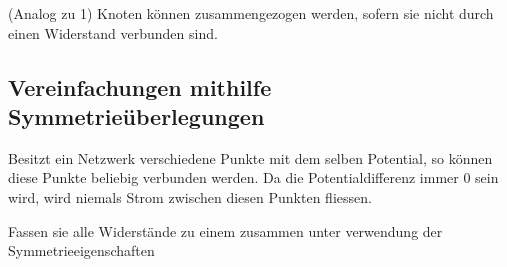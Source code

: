 										\iend
					\fix \fix
										\beginip
											(Analog zu 1) Knoten können zusammengezogen werden, sofern sie nicht durch einen Widerstand verbunden sind.
											\begin{center}

											\end{center}
										\iend

										\newpage


										\subsection{Vereinfachungen mithilfe Symmetrieüberlegungen}

										Besitzt ein Netzwerk verschiedene Punkte mit dem selben Potential, so können diese Punkte beliebig verbunden werden.
										Da die Potentialdifferenz immer 0 sein wird, wird niemals Strom zwischen diesen Punkten fliessen.

										\beginbsp
											Fassen sie alle Widerstände zu einem zusammen unter verwendung der Symmetrieeigenschaften
											\begin{center}
											\end{center}
										\iend

